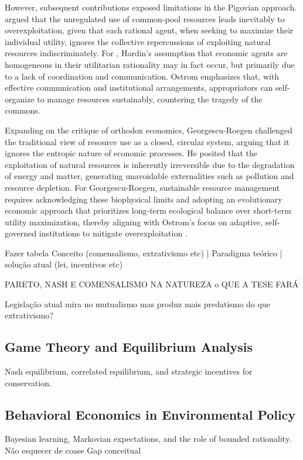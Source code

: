However, subsequent contributions exposed limitations in the Pigovian approach.  argued that the unregulated use of common-pool resources leads inevitably to overexploitation, given that each rational agent, when seeking to maximize their individual utility, ignores the collective repercussions of exploiting natural resources indiscriminately. For , Hardin's assumption that economic agents are homogeneous in their utilitarian rationality may in fact occur, but primarily due to a lack of coordination and communication. Ostrom emphasizes that, with effective communication and institutional arrangements, appropriators can self-organize to manage resources sustainably, countering the tragedy of the commons.

Expanding on the critique of orthodox economics, Georgescu-Roegen challenged the traditional view of resource use as a closed, circular system, arguing that it ignores the entropic nature of economic processes. He posited that the exploitation of natural resources is inherently irreversible due to the degradation of energy and matter, generating unavoidable externalities such as pollution and resource depletion. For Georgescu-Roegen, sustainable resource management requires acknowledging these biophysical limits and adopting an evolutionary economic approach that prioritizes long-term ecological balance over short-term utility maximization, thereby aligning with Ostrom’s focus on adaptive, self-governed institutions to mitigate overexploitation \cite{cechinEconomiaEcologicaEvolucionaria2010}.

Fazer tabela
Conceito (comensalismo, extrativismo etc) | Paradigma teórico | solução atual (lei, incentivos etc)

PARETO, NASH E COMENSALISMO NA NATUREZA
o QUE A TESE FARÁ 

Legislação atual mira no mutualismo mas produz mais predatismo do que extrativismo?

\subsection{Game Theory and Equilibrium Analysis}
Nash equilibrium, correlated equilibrium, and strategic incentives for conservation.

\subsection{Behavioral Economics in Environmental Policy}
Bayesian learning, Markovian expectations, and the role of bounded rationality.
Não esquecer de coase
Gap conceitual

